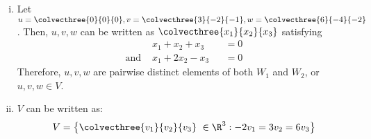 \begin{sol}
\begin{enumerate}[(i)]
\begin{proof}
\begin{enumerate}[(1)]
\[\begin{aligned}
                    \end{aligned}  
                \]
                Since $p_1+2p_2-p_3=q_1+2q_2-q_3=0$, $(p_1+q_1)+2(p_2+q_2)-(p_3+q_3)=0$, it follows that $ a+b\in W_2 $. Therefore, vector addition is closed under $W_2$.
                \item Scalar multiplication is closed under $W_1$ and $W_2$: Let $u\in W_1, v\in W_2, \lam\in\R$. Then, $u,v$ can be written as $u=\colvecthree{x_1}{x_2}{x_3} $, $v=\colvecthree{y_1}{y_2}{y_3}$ such that $x_1,x_2,x_3,y_1,y_2,y_3\in\R$ and $x_1+x_2+x_3=y_1+2y_2-y_3=0$. We have:
                \[
                    \begin{aligned}
                        \lam u = \colvecthree{\lam x_1}{\lam x_2}{\lam x_3},
                        \lam v = \colvecthree{\lam y_1}{\lam y_2}{\lam y_3}
                    \end{aligned}
                \]
                Since $x_1+x_2+x_3=y_1+2y_2-y_3=0$, $\lam x_1+\lam x_2+\lam x_3=\lam y_1+2\lam y_2-\lam y_3=0$. Thus, $\lam u\in W_1$ and $\lam v\in W_2$, or scalar multiplication is closed under both $W_1$ and $W_2$.
            \end{enumerate}
            Therefore, $W_1$ and $W_2$ are both subspaces of $\R^{3}.$
        \end{proof}
        \item Let $u=\colvecthree{0}{0}{0}, v=\colvecthree{3}{-2}{-1}, w=\colvecthree{6}{-4}{-2}$. Then, $u,v,w$ can be written as $\colvecthree{x_1}{x_2}{x_3}$ satisfying 
        \[
            \begin{aligned}
                &x_1+x_2+x_3 &&= 0\\
                \text{and } &x_1+2x_2-x_3 &&= 0
            \end{aligned}
        \]
        Therefore, $u,v,w$ are pairwise distinct elements of both $W_1$ and $W_2$, or $u,v,w\in V$.
        \item $V$ can be written as:
        \[
            \begin{aligned}
                V=\left\{ \colvecthree{v_1}{v_2}{v_3}\ \in\R^{3} : -2v_1=3v_2=6v_3 \right\}
            \end{aligned}
        \]
        
    \end{enumerate}
\end{sol}